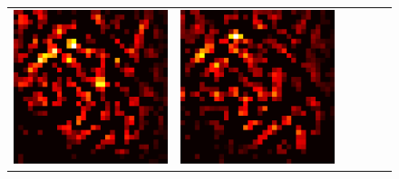 \documentclass[preprint,12pt]{elsarticle}
\begin{document}
\begin{figure}[p]
\begin{tabular}{cccccc}
  \includegraphics[scale=\scale]{../visualizations/examples/cifar10/resnet18/active_saliency_map/6.png} & 
  \includegraphics[scale=\scale]{../visualizations/examples/cifar10/resnet18/inactive_saliency_map/6.png} \\
  

\end{tabular}
\end{figure}
\end{document}
